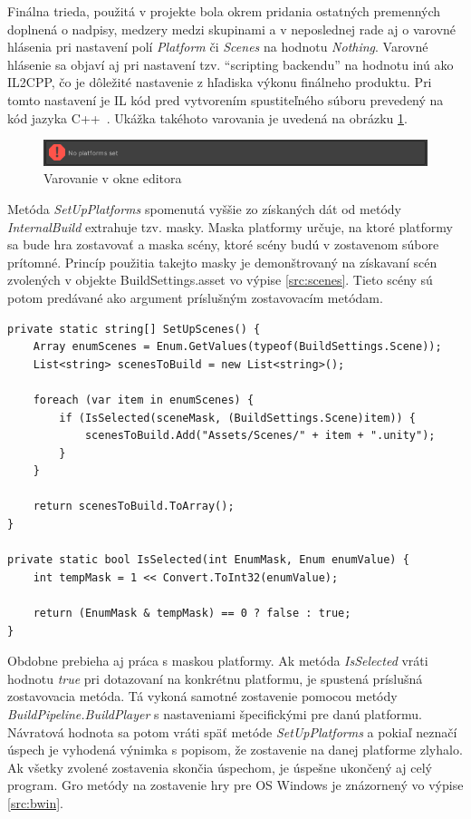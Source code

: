 \documentclass[slovak, bachelorpractice]{diploma}
\begin{document}
Finálna trieda, použitá v projekte bola okrem pridania ostatných premenných doplnená o nadpisy, medzery medzi skupinami a v neposlednej rade aj o varovné hlásenia pri nastavení polí \textit{Platform} či \textit{Scenes} na hodnotu \textit{Nothing}. Varovné hlásenie sa objaví aj pri nastavení tzv. \enquote{scripting backendu} na hodnotu inú ako IL2CPP, čo je dôležité nastavenie z hľadiska výkonu finálneho produktu. Pri tomto nastavení je IL kód pred vytvorením spustiteľného súboru prevedený na kód jazyka \mbox{C++ \cite{IL2CPP}}. Ukážka takéhoto varovania je uvedená na obrázku \ref{pic:Warr}.

\begin{figure}[!htbp]
	\centering
	\includegraphics[width=1\textwidth]{Pictures/warr.png}
	\caption{Varovanie v okne editora}
	\label{pic:Warr}
\end{figure}

Metóda \textit{SetUpPlatforms} spomenutá vyššie zo získaných dát od metódy \textit{InternalBuild} extrahuje tzv. masky. Maska platformy určuje, na ktoré platformy sa bude hra zostavovať a maska scény, ktoré scény budú v zostavenom súbore prítomné. Princíp použitia takejto masky je demonštrovaný na získavaní scén zvolených v objekte BuildSettings.asset vo výpise \ref{src:scenes}. Tieto scény sú potom predávané ako argument príslušným zostavovacím metódam. 

\vspace{10pt}
\begin{lstlisting}[label=src:scenes,caption={Extrahovanie zvolených scén pomocou masky}]
private static string[] SetUpScenes() {
    Array enumScenes = Enum.GetValues(typeof(BuildSettings.Scene));
    List<string> scenesToBuild = new List<string>();

    foreach (var item in enumScenes) {
        if (IsSelected(sceneMask, (BuildSettings.Scene)item)) {
            scenesToBuild.Add("Assets/Scenes/" + item + ".unity");
        }
    }

    return scenesToBuild.ToArray();
}

private static bool IsSelected(int EnumMask, Enum enumValue) {
    int tempMask = 1 << Convert.ToInt32(enumValue);
    
    return (EnumMask & tempMask) == 0 ? false : true;
}
\end{lstlisting}

Obdobne prebieha aj práca s maskou platformy. Ak metóda \textit{IsSelected} vráti hodnotu \textit{true} pri dotazovaní na konkrétnu platformu, je spustená príslušná zostavovacia metóda. Tá vykoná samotné zostavenie pomocou metódy \textit{BuildPipeline.BuildPlayer} s nastaveniami špecifickými pre danú platformu. Návratová hodnota sa potom vráti späť metóde \textit{SetUpPlatforms} a pokiaľ neznačí úspech je vyhodená výnimka s popisom, že zostavenie na danej platforme zlyhalo. Ak všetky zvolené zostavenia skončia úspechom, je úspešne ukončený aj celý program. Gro  metódy na zostavenie hry pre OS Windows je znázornený vo výpise \ref{src:bwin}. 
\end{document}
